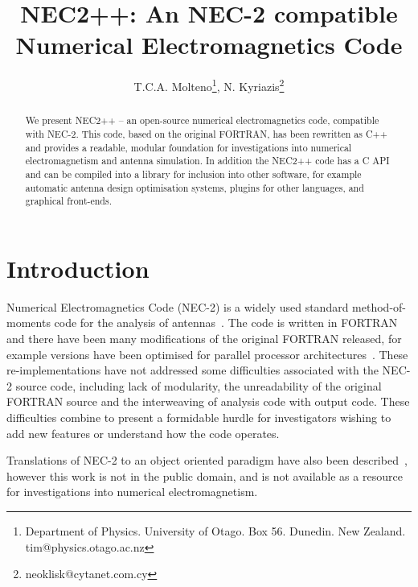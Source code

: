 \documentclass{report}
\title{NEC2++: An NEC-2 compatible Numerical Electromagnetics Code}
\author{T.C.A. Molteno\thanks{Department of Physics. University of Otago. Box 56. Dunedin. New Zealand. tim@physics.otago.ac.nz}, N. Kyriazis\thanks{neoklisk@cytanet.com.cy}}
\begin{document}
\lstset{language=C}
\lstset{tabsize=4}
\lstset{breaklines=true}
\lstset{showspaces=false}

\maketitle

\begin{abstract}
We present NEC2++ -- an open-source numerical electromagnetics code, compatible with 
NEC-2. This code, based on the original FORTRAN, has been rewritten as C++ and provides a readable, modular foundation for investigations into numerical electromagnetism
and antenna simulation. In addition the NEC2++ code has a C API and can be compiled into a library for inclusion into other software, for example automatic antenna design optimisation systems, plugins for other languages, and graphical front-ends.
\end{abstract}

\section{Introduction}

Numerical Electromagnetics Code (NEC-2) is a widely used standard method-of-moments code for the analysis of antennas~\cite{Burke81}. The code is written in FORTRAN and there have been many modifications of the original FORTRAN released, for example versions have been optimised for parallel processor architectures~\cite{Excell95, Nitch94, Rubinstein2003}. These re-implementations have not addressed some difficulties associated with the NEC-2 source code, including lack of modularity, the unreadability of the original FORTRAN source and the interweaving of analysis code with output code. These difficulties combine to present a formidable hurdle for investigators wishing to add new features or understand how the code operates.

Translations of NEC-2 to an object oriented paradigm have also been described~\cite{NitchOOP94}, however this work is not in the public domain, and is not available as a resource for investigations into numerical electromagnetism.
\end{document}
